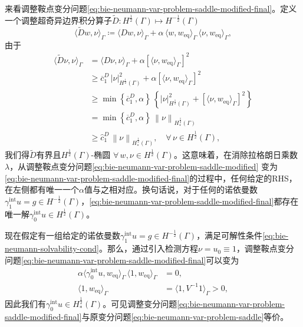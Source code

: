 来看调整鞍点变分问题\eqref{eq:bie-neumann-var-problem-saddle-modified-final}。定义一个调整超奇异边界积分算子$\widetilde{D} : H^{\frac{1}{2}}(\Gamma) \mapsto H^{-\frac{1}{2}}(\Gamma)$
\begin{equation*}
  \langle \widetilde{D} w, \nu \rangle_{\Gamma}
  \coloneqq
  \langle D w, \nu \rangle_{\Gamma}
  + \alpha \,
  \langle w, w_{\text{eq}} \rangle_{\Gamma} \,
  \langle \nu, w_{\text{eq}} \rangle_{\Gamma},
\end{equation*}
由于
\begin{equation*}
  \begin{split}
    \langle \widetilde{D} \nu, \nu \rangle_{\Gamma}
    & =
    \langle D \nu, \nu \rangle_{\Gamma}
    + \alpha \left[ \langle \nu, w_{\text{eq}} \rangle_{\Gamma} \right]^{2} \\
    & \ge \overline{c}_{1}^{D} \, \left| \nu \right|_{H^{\frac{1}{2}}(\Gamma)}^{2}
    + \alpha \left[ \langle \nu, w_{\text{eq}} \rangle_{\Gamma} \right]^{2} \\
    & \ge \min \left\{ \overline{c}_{1}^{D}, \alpha \right\} \,
    \left\{
    \left| \nu \right|_{H^{\frac{1}{2}}(\Gamma)}^{2}
    + \left[ \langle \nu, w_{\text{eq}} \rangle_{\Gamma} \right]^{2}
    \right\} \\
    & = \min \left\{ \overline{c}_{1}^{D}, \alpha \right\} \,
    \left\| \nu \right\|_{H_{*}^{\frac{1}{2}}(\Gamma)} \\
    & \ge \hat{c}_{1}^{D} \,
    \left\| \nu \right\|_{H_{*}^{\frac{1}{2}}(\Gamma)},
    \quad \forall \, \nu \in H^{\frac{1}{2}}(\Gamma),
  \end{split}
\end{equation*}
我们得$\widetilde{D}$有界且$H^{\frac{1}{2}}(\Gamma)$-椭圆 $\forall \, w, \nu \in H^{\frac{1}{2}}(\Gamma)$。这意味着，在消除拉格朗日乘数$\lambda$，从调整鞍点变分问题\eqref{eq:bie-neumann-var-problem-saddle-modified}
变为\eqref{eq:bie-neumann-var-problem-saddle-modified-final}的过程中，任何给定的RHS，在左侧都有唯一一个$\alpha$值与之相对应。换句话说，对于任何的诺依曼数$\gamma_{1}^{\text{int}} u = g \in H^{-\frac{1}{2}}(\Gamma)$，\eqref{eq:bie-neumann-var-problem-saddle-modified-final}都存在唯一解$\gamma_{0}^{\text{int}} u \in H^{\frac{1}{2}}(\Gamma)$。


现在假定有一组给定的诺依曼数$\gamma_{1}^{\text{int}} u = g \in H^{-\frac{1}{2}}(\Gamma)$，满足可解性条件\eqref{eq:bie-neumann-solvability-cond}。那么，通过引入检测方程$\nu = u_{0} \equiv 1$，调整鞍点变分问题\eqref{eq:bie-neumann-var-problem-saddle-modified-final}可以变为
\begin{equation*}
  \begin{split}
    \alpha \langle \gamma_{0}^{\text{int}} u, w_{\text{eq}} \rangle_{\Gamma} \, \langle 1, w_{\text{eq}} \rangle_{\Gamma} & = 0, \\
    \langle 1, w_{\text{eq}} \rangle_{\Gamma} & = \langle 1, V^{-1} 1 \rangle_{\Gamma} > 0,
  \end{split}
\end{equation*}
因此我们有$\gamma_{0}^{\text{int}} u \in H_{*}^{\frac{1}{2}}(\Gamma)$。可见调整变分问题\eqref{eq:bie-neumann-var-problem-saddle-modified-final}与原变分问题\eqref{eq:bie-neumann-var-problem-saddle}等价。

